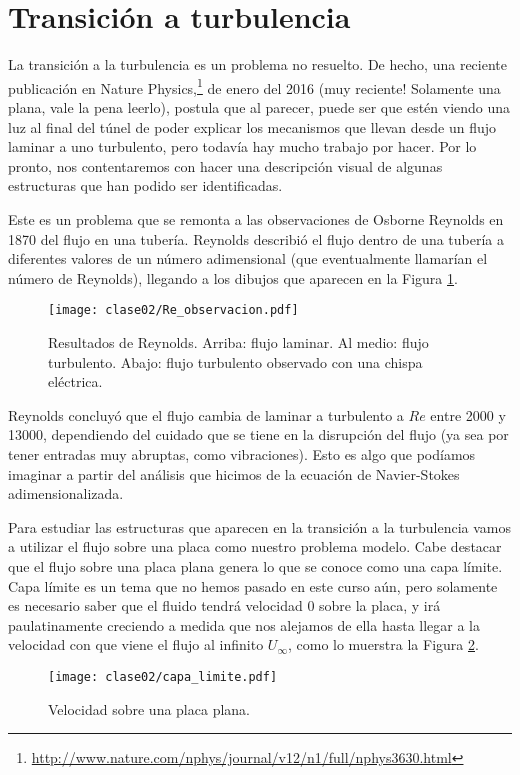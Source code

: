 \section*{Transición a turbulencia}

La transición a la turbulencia es un problema no resuelto.
De hecho, una reciente publicación en Nature Physics,\footnote{\url{http://www.nature.com/nphys/journal/v12/n1/full/nphys3630.html}} de enero del 2016 (muy reciente! Solamente una plana, vale la pena leerlo), postula que al parecer, puede ser que estén viendo una luz al final del túnel de poder explicar los mecanismos que llevan desde un flujo laminar a uno turbulento, pero todavía hay mucho trabajo por hacer.
Por lo pronto, nos contentaremos con hacer una descripción visual de algunas estructuras que han podido ser identificadas.

Este es un problema que se remonta a las observaciones de Osborne Reynolds en 1870 del flujo en una tubería.
Reynolds describió el flujo dentro de una tubería a diferentes valores de un número adimensional (que eventualmente llamarían el número de Reynolds), llegando a los dibujos que aparecen en la Figura \ref{fig:Re_observacion}.
%
\begin{figure}[h!]
\centering
\texttt{[image: clase02/Re\_observacion.pdf]}
\caption{Resultados de Reynolds. Arriba: flujo laminar. Al medio: flujo turbulento. Abajo: flujo turbulento observado con una chispa eléctrica.}
\label{fig:Re_observacion}
\end{figure}

Reynolds concluyó que el flujo cambia de laminar a turbulento a $Re$ entre 2000 y 13000, dependiendo del cuidado que se tiene en la disrupción del flujo (ya sea por tener entradas muy abruptas, como vibraciones).
Esto es algo que podíamos imaginar a partir del análisis que hicimos de la ecuación de Navier-Stokes adimensionalizada.

Para estudiar las estructuras que aparecen en la transición a la turbulencia vamos a utilizar el flujo sobre una placa como nuestro problema modelo.
Cabe destacar que el flujo sobre una placa plana genera lo que se conoce como una capa límite. 
Capa límite es un tema que no hemos pasado en este curso aún, pero solamente es necesario saber que el fluido tendrá velocidad 0 sobre la placa, y irá paulatinamente creciendo a medida que nos alejamos de ella hasta llegar a la velocidad con que viene el flujo al infinito $U_\infty$, como lo muerstra la Figura \ref{fig:capa_limite}.
%
\begin{figure}[h!]
\centering
\texttt{[image: clase02/capa\_limite.pdf]}
\caption{Velocidad sobre una placa plana.}
\label{fig:capa_limite}
\end{figure}

